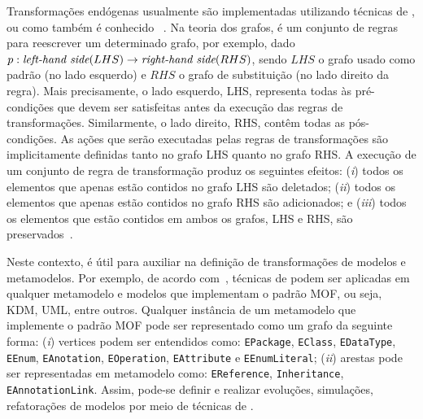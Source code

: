 Transformações endógenas usualmente são implementadas utilizando técnicas de , ou como também é conhecido ~\cite{Ehrig_2006}. Na teoria dos grafos,  é um conjunto de regras para reescrever um determinado grafo, por exemplo, dado $p: \emph{left-hand side} (LHS) \rightarrow \emph{right-hand side} (RHS)$, sendo $LHS$ o grafo usado como padrão (no lado esquerdo) e $RHS$ o grafo de substituição (no lado direito da regra). Mais precisamente, o lado esquerdo, LHS, representa todas às pré-condições que devem ser satisfeitas antes da execução das regras de transformações. Similarmente, o lado direito, RHS, contêm todas as pós-condições. As ações que serão executadas pelas regras de transformações são implicitamente definidas tanto no grafo LHS quanto no grafo RHS. A execução de um conjunto de regra de transformação produz os seguintes efeitos: (\textit{i}) todos os elementos que apenas estão contidos no grafo LHS são deletados; (\textit{ii}) todos os elementos que apenas estão contidos no grafo RHS são adicionados; e (\textit{iii}) todos os elementos que estão contidos em ambos os grafos, LHS e RHS, são preservados~\cite{Ehrig_2006}. 

Neste contexto,  é útil para auxiliar na definição de transformações de modelos e metamodelos. Por exemplo, de acordo com~, técnicas de  podem ser aplicadas em qualquer metamodelo e modelos que implementam o padrão MOF, ou seja, KDM, UML, entre outros. Qualquer instância de um metamodelo que implemente o padrão MOF pode ser representado como um grafo da seguinte forma: (\textit{i}) vertices podem ser entendidos como: \texttt{EPackage}, \texttt{EClass}, \texttt{EDataType}, \texttt{EEnum}, \texttt{EAnotation}, \texttt{EOperation}, \texttt{EAttribute} e \texttt{EEnumLiteral}; (\textit{ii}) arestas pode ser representadas em metamodelo como: \texttt{EReference}, \texttt{Inheritance}, \texttt{EAnnotationLink}. Assim, pode-se definir e realizar evoluções, simulações, refatorações de modelos por meio de técnicas de . 


